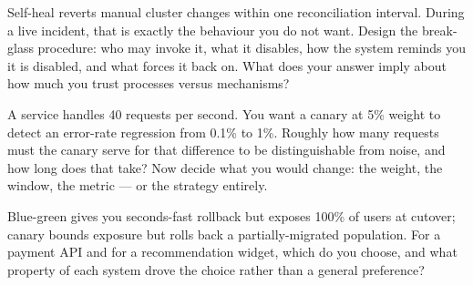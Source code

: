 
\begin{thinkbox}
Self-heal reverts manual cluster changes within one reconciliation interval. During a live incident, that is exactly the behaviour you do not want. Design the break-glass procedure: who may invoke it, what it disables, how the system reminds you it is disabled, and what forces it back on. What does your answer imply about how much you trust processes versus mechanisms?
\end{thinkbox}

\begin{thinkbox}
A service handles 40 requests per second. You want a canary at 5\% weight to detect an error-rate regression from 0.1\% to 1\%. Roughly how many requests must the canary serve for that difference to be distinguishable from noise, and how long does that take? Now decide what you would change: the weight, the window, the metric --- or the strategy entirely.
\end{thinkbox}

\begin{thinkbox}
Blue-green gives you seconds-fast rollback but exposes 100\% of users at cutover; canary bounds exposure but rolls back a partially-migrated population. For a payment API and for a recommendation widget, which do you choose, and what property of each system drove the choice rather than a general preference?
\end{thinkbox}


